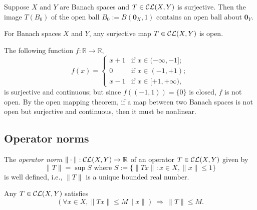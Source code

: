 \begin{lem}
  \label{lem:helpForOpenMapping}
  Suppose $X$ and $Y$ are Banach spaces
  and $T\in {\cal CL}(X,Y)$ is surjective.
  Then the image $T(B_0)$ of the open ball
  $B_0:=B(\mathbf{0}_X,1)$ contains an open ball about $\mathbf{0}_Y$.
\end{lem}

\begin{thm}
  \label{thm:openMapping}
  For Banach spaces $X$ and $Y$,
  any surjective map $T\in {\cal CL}(X,Y)$ is open.
\end{thm}

\begin{exm}
  The following function $f: \mathbb{R}\rightarrow \mathbb{R}$, 
  \begin{displaymath}
    f(x) =
    \begin{cases}
      x+1 & \text{if } x\in (-\infty, -1];
      \\
      0 & \text{if } x\in (-1, +1);
      \\
      x-1 & \text{if } x\in [+1,+\infty),
    \end{cases}
  \end{displaymath}
  is surjective and continuous;
  but since $f((-1,1))=\{0\}$ is closed,
  $f$ is not open.
  By the open mapping theorem,
  if a map between two Banach spaces
  is not open but surjective and continuous, 
  then it must be nonlinear.
\end{exm}

\subsection{Operator norms}
\label{sec:operator-norms}

\begin{lem}
  \label{def:OpNormCLXY}
  The \emph{operator norm}
  $\|\cdot\|: {\cal CL}(X,Y)\rightarrow \mathbb{R}$
  of an operator $T\in {\cal CL}(X,Y)$ given by 
  \begin{equation}
    \label{eq:OpNormCLXY}
    \|T\|= \sup S \text{ where }
    S:=\bigl\{\|Tx\|: x\in X, \|x\|\le 1\bigr\} 
  \end{equation}
  is well defined, i.e., $\|T\|$ is a unique bounded real number.
\end{lem}

\begin{lem}
  \label{lem:opNormIsLeastUpperBound}
  Any $T\in {\cal CL}(X,Y)$ satisfies 
  \begin{equation}
    \label{eq:opNormIsLeastUpperBound}
    \left(\forall x\in X, \|Tx\|\le M \|x\|\right)
    \ \Rightarrow\ \|T\|\le M.
  \end{equation}
\end{lem}

